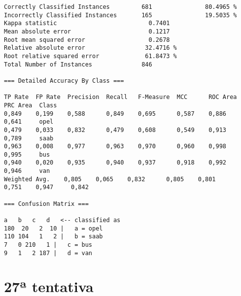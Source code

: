 \documentclass[
	article,			%
	11pt,				%
	oneside,			%
	a4paper,			%
	english,			%
	brazil,				%
	sumario=tradicional
	]{abntex2}
\begin{document}
\begin{lstlisting}
Correctly Classified Instances         681               80.4965 %
Incorrectly Classified Instances       165               19.5035 %
Kappa statistic                          0.7401
Mean absolute error                      0.1217
Root mean squared error                  0.2678
Relative absolute error                 32.4716 %
Root relative squared error             61.8473 %
Total Number of Instances              846     

=== Detailed Accuracy By Class ===

TP Rate  FP Rate  Precision  Recall   F-Measure  MCC      ROC Area  PRC Area  Class
0,849    0,199    0,588      0,849    0,695      0,587    0,886     0,641     opel
0,479    0,033    0,832      0,479    0,608      0,549    0,913     0,789     saab
0,963    0,008    0,977      0,963    0,970      0,960    0,998     0,995     bus
0,940    0,020    0,935      0,940    0,937      0,918    0,992     0,946     van
Weighted Avg.    0,805    0,065    0,832      0,805    0,801      0,751    0,947     0,842     

=== Confusion Matrix ===

a   b   c   d   <-- classified as
180  20   2  10 |   a = opel
110 104   1   2 |   b = saab
7   0 210   1 |   c = bus
9   1   2 187 |   d = van

\end{lstlisting}

\section{27ª tentativa}
\end{document}
